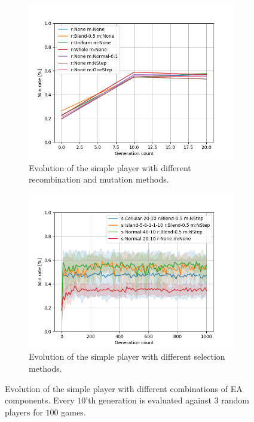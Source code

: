 \documentclass{llncs}
\begin{document}
\begin{figure}[t]
    \centering
    \begin{subfigure}[t]{0.49\textwidth}
        \centering
        \captionsetup{width=.9\textwidth}
        \includegraphics[width=\textwidth]{figures/simple/simple_recombs_mutations.png}
        \caption{Evolution of the simple player with different recombination and mutation methods.}
        \label{subfig:evolution_simple_recomb_mutation}
    \end{subfigure}
    \begin{subfigure}[t]{0.49\textwidth}
        \centering
        \captionsetup{width=.9\textwidth}
        \includegraphics[width=\textwidth]{figures/simple/eval_simple.png}
        \caption{Evolution of the simple player with different selection methods.}
        \label{subfig:evolution_simple_comb}
    \end{subfigure}
    \caption{Evolution of the simple player with different combinations of EA components. Every $10$'th generation is evaluated against $3$ random players for $100$ games.}
    \label{fig:}
\end{figure}
\end{document}
